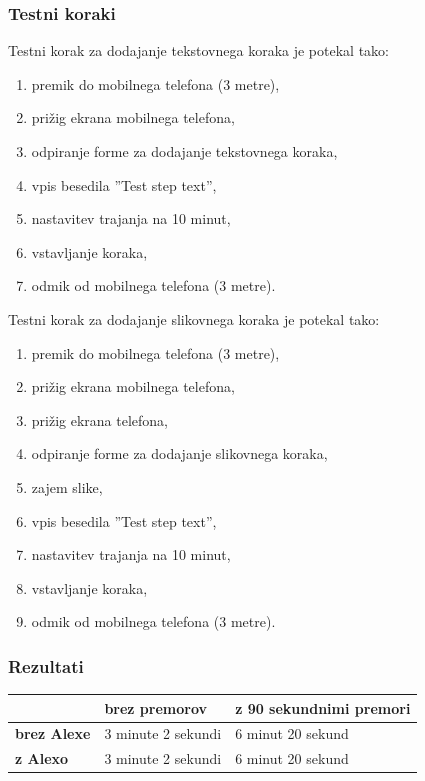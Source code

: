 \documentclass[a4paper, 12pt]{book}
\begin{document}
\subsubsection{Testni koraki}

\noindent Testni korak za dodajanje tekstovnega koraka je potekal tako:
\begin{enumerate}
	\item premik do mobilnega telefona (3 metre),
	\item prižig ekrana mobilnega telefona,
	\item odpiranje forme za dodajanje tekstovnega koraka,
	\item vpis besedila ''Test step text'',
	\item nastavitev trajanja na 10 minut,
	\item vstavljanje koraka,
	\item odmik od mobilnega telefona (3 metre).
\end{enumerate}

\noindent Testni korak za dodajanje slikovnega koraka je potekal tako:
\begin{enumerate}
	\item premik do mobilnega telefona (3 metre),
	\item prižig ekrana mobilnega telefona,
	\item prižig ekrana telefona,
	\item odpiranje forme za dodajanje slikovnega koraka,
	\item zajem slike,
	\item vpis besedila ''Test step text'',
	\item nastavitev trajanja na 10 minut,
	\item vstavljanje koraka,
	\item odmik od mobilnega telefona (3 metre).
\end{enumerate}


\subsubsection{Rezultati}

\noindent\begin{tabular}{p{}|p{}|p{}}    %
  {\bf } & {\bf brez premorov}                             & {\bf z 90 sekundnimi premori} \\ \hline
  {\bf brez Alexe} & 3 minute 2 sekundi & 6 minut 20 sekund \\
  {\bf z Alexo} & 3 minute 2 sekundi & 6 minut 20 sekund \\
\end{tabular}
\end{document}
